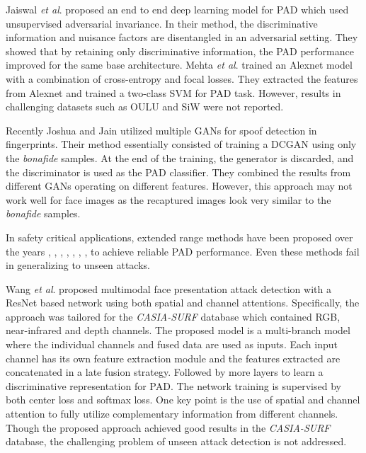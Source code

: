 \documentclass[journal]{IEEEtran}
\begin{document}
Jaiswal \textit{et al}. \cite{jaiswal2019ropad} proposed an end to end deep learning model for PAD which used unsupervised adversarial invariance. In their method, the discriminative information and nuisance factors are disentangled in an adversarial setting. They showed that by retaining only discriminative information, the PAD performance improved for the same base architecture. Mehta \textit{et al}. \cite{mehtacrafting} trained an Alexnet model with a combination of cross-entropy and focal losses. They extracted the features from Alexnet and trained a two-class SVM for PAD task. However, results in challenging datasets such as OULU and SiW were not reported.

Recently Joshua and Jain \cite{engelsma2019generalizing} utilized multiple GANs for spoof detection in fingerprints. Their method essentially consisted of training a DCGAN \cite{radford2015unsupervised} using only the \textit{bonafide} samples. At the end of the training, the generator is discarded, and the discriminator is used as the PAD classifier. They combined the results from different GANs operating on different features. However, this approach may not work well for face images as the recaptured images look very similar to the \textit{bonafide} samples.

In safety critical applications, extended range methods have been proposed over the years \cite{raghavendra2017extended}, \cite{erdogmus2014spoofing}, \cite{steiner2016reliable}, \cite{dhamecha2013disguise}, \cite{agarwal2017face}, \cite{Bhattacharjee:256262}, \cite{bhattacharjee2017you}, \cite{george_mccnn_tifs2019} to achieve reliable PAD performance. Even these methods fail in generalizing to unseen attacks.

Wang \textit{et al}. \cite{wang2019multi} proposed multimodal face presentation attack detection with a ResNet based network using both spatial and channel attentions.
Specifically, the approach was tailored for the \textit{CASIA-SURF} \cite{zhang2018casia} database which contained RGB, near-infrared and depth channels. The proposed model is a multi-branch model where the individual channels and fused data are used as inputs. Each input channel has its own feature extraction module and the features extracted are concatenated in a late fusion strategy. Followed by more layers to learn a discriminative representation for PAD. The network training is supervised by both center loss and softmax loss. One key point is the use of spatial and channel attention to fully utilize complementary information from different channels. Though the proposed approach achieved good results in the \textit{CASIA-SURF} database, the challenging problem of unseen attack detection is not addressed.
\end{document}
